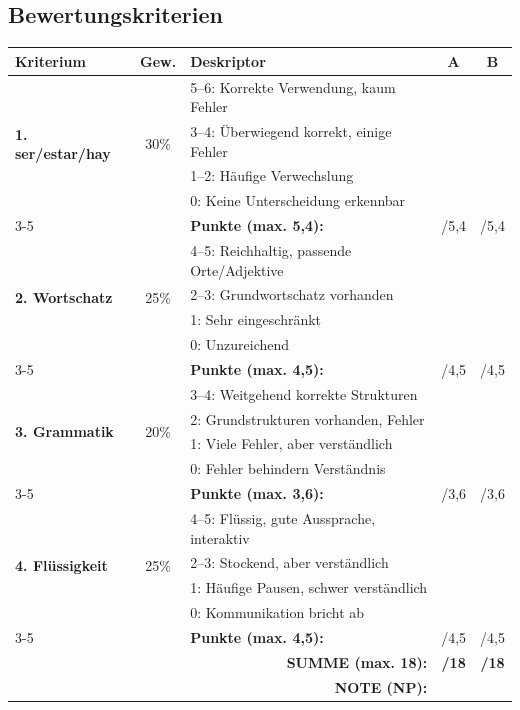 \documentclass[11pt,a4paper]{article}
\begin{document}
\vspace{1em}

\subsection*{Bewertungskriterien}

\begin{tabular}{|p{4cm}|c|p{5cm}|c|c|}
\hline
\textbf{Kriterium} & \textbf{Gew.} & \textbf{Deskriptor} & \textbf{A} & \textbf{B} \\
\hline
\hline
\multirow{4}{*}{\textbf{1. ser/estar/hay}} & \multirow{4}{*}{30\%} & 5--6: Korrekte Verwendung, kaum Fehler & & \\
& & 3--4: Überwiegend korrekt, einige Fehler & & \\
& & 1--2: Häufige Verwechslung & & \\
& & 0: Keine Unterscheidung erkennbar & & \\
\cline{3-5}
& & \textbf{Punkte (max. 5,4):} & /5,4 & /5,4 \\
\hline
\hline
\multirow{4}{*}{\textbf{2. Wortschatz}} & \multirow{4}{*}{25\%} & 4--5: Reichhaltig, passende Orte/Adjektive & & \\
\textbf{(Stadtviertel/Orte)} & & 2--3: Grundwortschatz vorhanden & & \\
& & 1: Sehr eingeschränkt & & \\
& & 0: Unzureichend & & \\
\cline{3-5}
& & \textbf{Punkte (max. 4,5):} & /4,5 & /4,5 \\
\hline
\hline
\multirow{4}{*}{\textbf{3. Grammatik}} & \multirow{4}{*}{20\%} & 3--4: Weitgehend korrekte Strukturen & & \\
\textbf{(Korrektheit)} & & 2: Grundstrukturen vorhanden, Fehler & & \\
& & 1: Viele Fehler, aber verständlich & & \\
& & 0: Fehler behindern Verständnis & & \\
\cline{3-5}
& & \textbf{Punkte (max. 3,6):} & /3,6 & /3,6 \\
\hline
\hline
\multirow{4}{*}{\textbf{4. Flüssigkeit}} & \multirow{4}{*}{25\%} & 4--5: Flüssig, gute Aussprache, interaktiv & & \\
\textbf{(+ Verständlichkeit)} & & 2--3: Stockend, aber verständlich & & \\
& & 1: Häufige Pausen, schwer verständlich & & \\
& & 0: Kommunikation bricht ab & & \\
\cline{3-5}
& & \textbf{Punkte (max. 4,5):} & /4,5 & /4,5 \\
\hline
\hline
\multicolumn{3}{|r|}{\textbf{SUMME (max. 18):}} & \textbf{/18} & \textbf{/18} \\
\hline
\multicolumn{3}{|r|}{\textbf{NOTE (NP):}} & & \\
\hline
\end{tabular}
\end{document}
